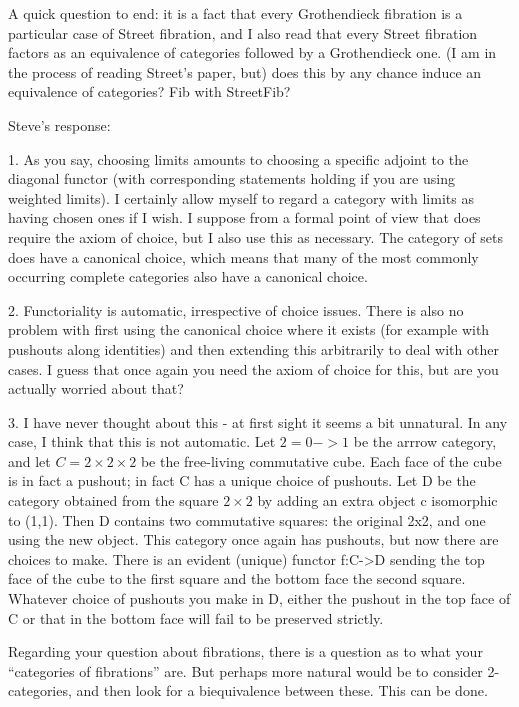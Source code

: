 \documentclass{amsart}
\begin{document}
A quick question to end: it is a fact that every Grothendieck fibration is a particular case of Street fibration,
and I also read that every Street fibration factors as an equivalence of categories followed by a Grothendieck one.
(I am in the process of reading Street's paper, but) does this by any chance induce an equivalence of categories? Fib with StreetFib?

{\chris Steve's response:}

1. As you say, choosing limits amounts to choosing a specific adjoint to the diagonal functor (with corresponding
statements holding if you are using weighted limits). I certainly allow myself to regard a category with limits as having
chosen ones if I wish. I suppose from a formal point of view that does require the axiom of choice, but I also use this as necessary.
The category of sets does have a canonical choice, which means that many of the most commonly occurring complete categories
also have a canonical choice.

2. Functoriality is automatic, irrespective of choice issues. There is also no problem with first using the canonical
choice where it exists (for example with pushouts along identities) and then extending this arbitrarily to deal with other cases.
I guess that once again you need the axiom of choice for this, but are you actually worried about that?

3. I have never thought about this - at first sight it seems a bit unnatural. In any case, I think that this
is not automatic. Let $2={0->1}$ be the arrrow category, and let $C=2\times 2\times 2$ be the free-living commutative cube.
Each face of the cube is in fact a pushout; in fact C has a unique choice of pushouts. Let D be the category obtained from the
square $2\times 2$ by adding an extra object c isomorphic to (1,1). Then D contains two commutative squares:
the original 2x2, and one using the new object. This category once again has pushouts, but now there are choices to make.
There is an evident (unique) functor f:C->D sending the top face of the cube to the first square and the bottom
face the second square. Whatever choice of pushouts you make in D, either the pushout in the top face of
C or that in the bottom face will fail to be preserved strictly.

Regarding your question about fibrations, there is a question as to
what your ``categories of fibrations'' are.
But perhaps more natural would be to consider 2-categories, and then look for a biequivalence between these. This can be done.
\end{document}
